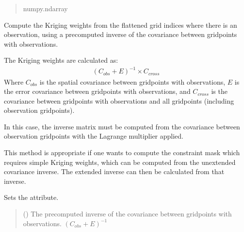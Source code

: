 \documentclass[letterpaper,10pt,english]{sphinxmanual}
\begin{document}
\begin{fulllineitems}
\begin{fulllineitems}
\begin{quote}
\begin{description}
\sphinxAtStartPar
numpy.ndarray

\end{description}\end{quote}

\end{fulllineitems}


\begin{fulllineitems}
\label{\detokenize{kriging:glomar_gridding.kriging.OrdinaryKriging.kriging_weights_from_inverse}}
\pysigstartsignatures
\pysiglinewithargsret
{}
{}
{}
\pysigstopsignatures
\sphinxAtStartPar
Compute the Kriging weights from the flattened grid indices where
there is an observation, using a pre\sphinxhyphen{}computed inverse of the covariance
between grid\sphinxhyphen{}points with observations.

\sphinxAtStartPar
The Kriging weights are calculated as:
\begin{equation*}
\begin{split}(C_{obs} + E)^{-1} \times C_{cross}\end{split}
\end{equation*}
\sphinxAtStartPar
Where \(C_{obs}\) is the spatial covariance between grid\sphinxhyphen{}points
with observations, \(E\) is the error covariance between grid\sphinxhyphen{}points
with observations, and \(C_{cross}\) is the covariance between
grid\sphinxhyphen{}points with observations and all grid\sphinxhyphen{}points (including observation
grid\sphinxhyphen{}points).

\sphinxAtStartPar
In this case, the inverse matrix must be computed from the covariance
between observation grid\sphinxhyphen{}points with the Lagrange multiplier applied.

\sphinxAtStartPar
This method is appropriate if one wants to compute the constraint mask
which requires simple Kriging weights, which can be computed from the
unextended covariance inverse. The extended inverse can then be
calculated from that inverse.

\sphinxAtStartPar
Sets the  attribute.
\begin{quote}\begin{description}
\sphinxAtStartPar
{} () \textendash{} The pre\sphinxhyphen{}computed inverse of the covariance between grid\sphinxhyphen{}points with
observations. \((C_{obs} + E)^{-1}\)


\end{description}
\end{quote}
\end{fulllineitems}
\end{fulllineitems}
\end{document}
